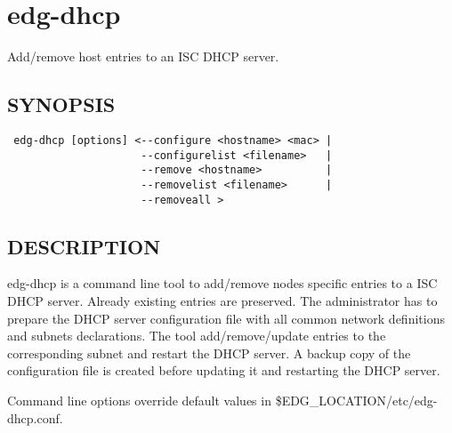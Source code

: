 \section{edg-dhcp\label{edg-dhcp}}


Add/remove host entries to an ISC DHCP server.

\subsection*{SYNOPSIS\label{edg-dhcp_SYNOPSIS}}
\begin{verbatim}
 edg-dhcp [options] <--configure <hostname> <mac> |
                     --configurelist <filename>   |
                     --remove <hostname>          |
                     --removelist <filename>      |
                     --removeall >
\end{verbatim}
\subsection*{DESCRIPTION\label{edg-dhcp_DESCRIPTION}}


edg-dhcp is a command line tool to add/remove nodes specific entries to
a ISC DHCP server. Already existing entries are preserved.
The administrator has to prepare the DHCP server configuration file with
all common network definitions and subnets declarations. The tool
add/remove/update entries to the corresponding subnet and restart the
DHCP server. A backup copy of the configuration file is created
before updating it and restarting the DHCP server.



Command line options override default values in \$EDG\_LOCATION/etc/edg-dhcp.conf.

